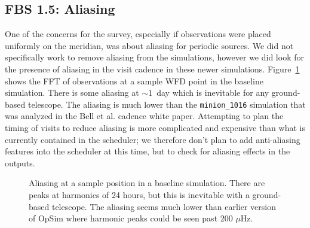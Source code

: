 \subsection{FBS 1.5: Aliasing}

One of the concerns for the survey, especially if observations were placed uniformly on the meridian, was about aliasing for periodic sources. We did not specifically work to remove aliasing from the simulations, however we did look for the presence of aliasing in the visit cadence in these newer simulations.  Figure~\ref{fig:alias} shows the FFT of observations at a sample WFD point in the baseline simulation. There is some aliasing at $\sim1$\ day which is inevitable for any ground-based telescope.  The aliasing is much lower than the {\tt minion\_1016} simulation that was analyzed in the Bell et al. cadence white paper. Attempting to plan the timing of visits to reduce aliasing is more complicated and expensive than what is currently contained in the scheduler; we therefore don't plan to add anti-aliasing features into the scheduler at this time, but to check for aliasing effects in the outputs.

\begin{figure}
\label{fig:alias}
\caption{Aliasing at a sample position in a baseline simulation. There are peaks at harmonics of 24 hours, but this is inevitable with a ground-based telescope. The aliasing seems much lower than earlier version of OpSim where harmonic peaks could be seen past 200 $\mu$Hz.}
\end{figure}


